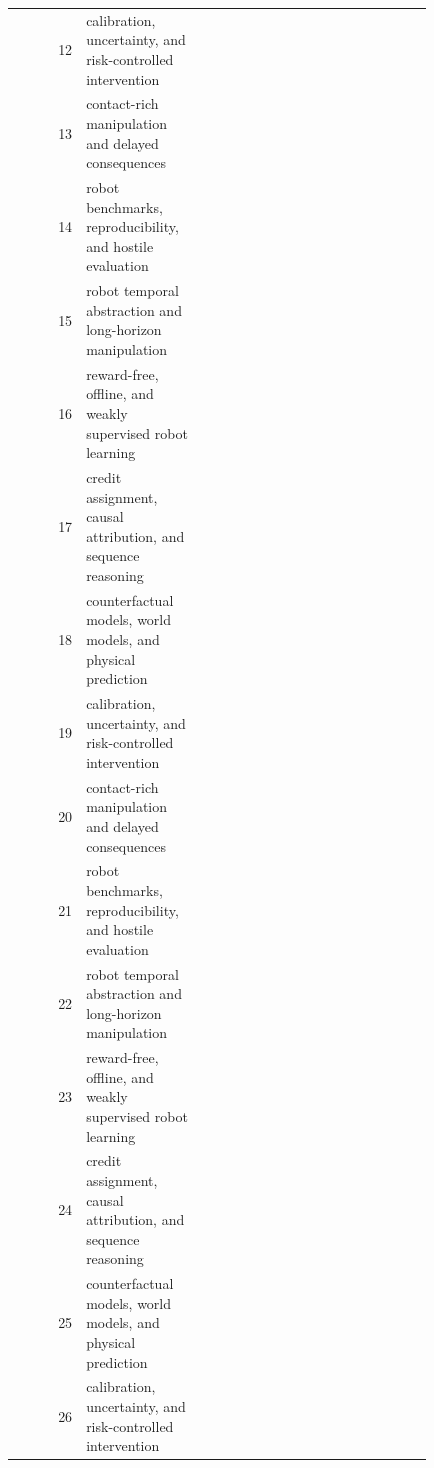\documentclass{article}
\begin{document}
\begin{longtable}{@{}r p{0.28\linewidth} p{0.55\linewidth}@{}}
12 & calibration, uncertainty, and risk-controlled intervention & \citep{andersen2017integration34,pantojagarcia2025physical35,losey2020learning36} \\
13 & contact-rich manipulation and delayed consequences & \citep{huang2023diffusion37,wu2025savor38,zhao2024neural39} \\
14 & robot benchmarks, reproducibility, and hostile evaluation & \citep{zhang2025humanrobot40,vora2025reward41,huang2025leskill42} \\
15 & robot temporal abstraction and long-horizon manipulation & \citep{oh2025bimanual43,zhang2026skill44,vora2024reward45} \\
16 & reward-free, offline, and weakly supervised robot learning & \citep{li2022asteroids46,burke2023learning47,lee2023exercise48} \\
17 & credit assignment, causal attribution, and sequence reasoning & \citep{ma2023eureka49,zhu2022bottomup50,shah2025advancements51} \\
18 & counterfactual models, world models, and physical prediction & \citep{ma2023liv52,oh2024bimanual53,yang2024adapt2reward54} \\
19 & calibration, uncertainty, and risk-controlled intervention & \citep{arimoto2010iterative55,mohsin2026multiagent56,li2021learning57} \\
20 & contact-rich manipulation and delayed consequences & \citep{ji2026recovering58,qi2025semanticgeometricphysicaldriven59,chen2026deco60} \\
21 & robot benchmarks, reproducibility, and hostile evaluation & \citep{feng2026dhtxlstm61,zhang2022exploiting62,yu2023language63} \\
22 & robot temporal abstraction and long-horizon manipulation & \citep{peters2007reinforcement64,alves2025curriculumguided65,kurniawati2011motion66} \\
23 & reward-free, offline, and weakly supervised robot learning & \citep{he2023robotic67,cheng2023league68,singh2019endtoend69} \\
24 & credit assignment, causal attribution, and sequence reasoning & \citep{lin2024hierarchical70,krishnan2018swirl71,zhao2017tensor72} \\
25 & counterfactual models, world models, and physical prediction & \citep{ren2022effects73,vora2021influence74,huang2023valueinformed75} \\
26 & calibration, uncertainty, and risk-controlled intervention & \citep{gao2025must76,maithani2019predicting77,fang2022anygrasp78} \\

\end{longtable}
\end{document}
